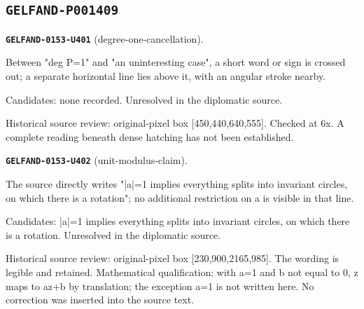 \subsection*{\texttt{GELFAND-P001409}}
\par\noindent\leavevmode{}\label{GELFAND-0153-U401}\textbf{\texttt{GELFAND-0153-U401}} (degree-one-cancellation).\nopagebreak[4]\par
Between "deg P=1" and "an uninteresting case", a short word or sign is crossed out; a separate horizontal line lies above it, with an angular stroke nearby.\par
Candidates: none recorded. Unresolved in the diplomatic source.\par
Historical source review: original-pixel box [450,440,640,555]. Checked at 6x. A complete reading beneath dense hatching has not been established.\par\medskip
\par\noindent\leavevmode{}\label{GELFAND-0153-U402}\textbf{\texttt{GELFAND-0153-U402}} (unit-modulus-claim).\nopagebreak[4]\par
The source directly writes "|a|=1 implies everything splits into invariant circles, on which there is a rotation"; no additional restriction on a is visible in that line.\par
Candidates: |a|=1 implies everything splits into invariant circles, on which there is a rotation. Unresolved in the diplomatic source.\par
Historical source review: original-pixel box [230,900,2165,985]. The wording is legible and retained. Mathematical qualification: with a=1 and b not equal to 0, z maps to az+b by translation; the exception a=1 is not written here. No correction was inserted into the source text.\par\medskip
